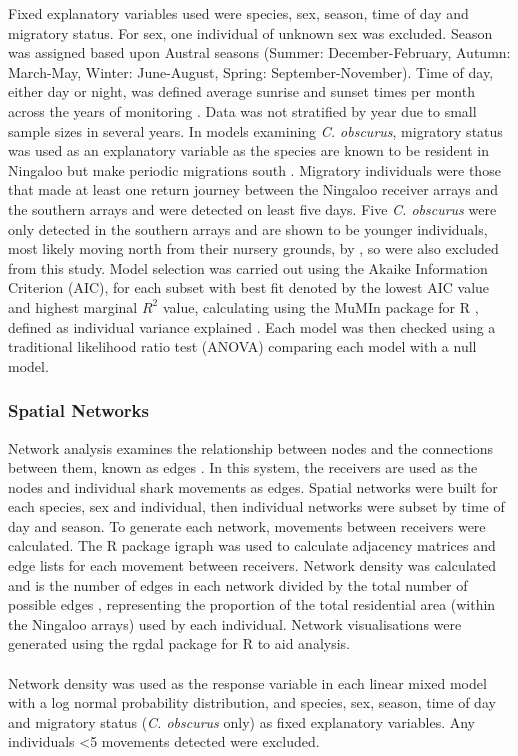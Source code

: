 \documentclass[11pt,a4paper]{article}
\begin{document}
	Fixed explanatory variables used were species, sex, season, time of day and migratory status. For sex, one individual of unknown sex was excluded. Season was assigned based upon Austral seasons (Summer: December-February, Autumn: March-May, Winter: June-August, Spring: September-November). Time of day, either day or night, was defined average sunrise and sunset times per month across the years of monitoring \citep{GeoscienceAustralia2015}. Data was not stratified by year due to small sample sizes in several years. In models examining \textit{C. obscurus}, migratory status was used as an explanatory variable as the species are known to be resident in Ningaloo but make periodic migrations south \citep{Braccini2017b}. Migratory individuals were those that made at least one return journey between the Ningaloo receiver arrays and the southern arrays and were detected on least five days. Five \textit{C. obscurus} were only detected in the southern arrays and are shown to be younger individuals, most likely moving north from their nursery grounds, by \citealt{Braccini2017b}, so were also excluded from this study. Model selection was carried out using the Akaike Information Criterion (AIC), for each subset with best fit denoted by the lowest AIC value and highest marginal $R^2$ value, calculating using the MuMIn package for R \citep{Barton2019}, defined as individual variance explained \citep{Nakagawa2013}. Each model was then checked using a traditional likelihood ratio test (ANOVA) comparing each model with a null model.\\
	
	
	\subsubsection{Spatial Networks}
	
	Network analysis examines the relationship between nodes and the connections between them, known as edges \citep{West2001}. In this system, the receivers are used as the nodes and individual shark movements as edges. Spatial networks were built for each species, sex and individual, then individual networks were subset by time of day and season. To generate each network, movements between receivers were calculated. The R package igraph \citep{Csardi2006} was used to calculate adjacency matrices and edge lists for each movement between receivers. Network density was calculated and is the number of edges in each network divided by the total number of possible edges \citep{Mourier2018}, representing the proportion of the total residential area (within the Ningaloo arrays) used by each individual. Network visualisations were generated using the rgdal package for R \citep{Bivand2019} to aid analysis. \\
	\\
	Network density was used as the response variable in each linear mixed model with a log normal probability distribution, and species, sex, season, time of day and migratory status (\textit{C. obscurus} only) as fixed explanatory variables. Any individuals \textless 5 movements detected were excluded. \
	
\end{document}
